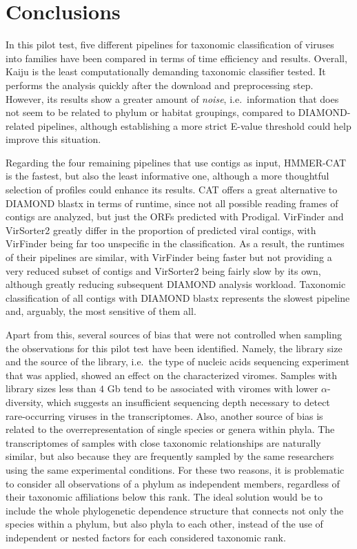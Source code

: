 \documentclass[
  openany]{book}
\begin{document}
\hypertarget{conclusions}{%
\section{Conclusions}\label{conclusions}}

In this pilot test, five different pipelines for taxonomic classification of viruses into families have been compared in terms of time efficiency and results. Overall, Kaiju is the least computationally demanding taxonomic classifier tested. It performs the analysis quickly after the download and preprocessing step. However, its results show a greater amount of \emph{noise}, i.e.~information that does not seem to be related to phylum or habitat groupings, compared to DIAMOND-related pipelines, although establishing a more strict E-value threshold could help improve this situation.

Regarding the four remaining pipelines that use contigs as input, HMMER-CAT is the fastest, but also the least informative one, although a more thoughtful selection of profiles could enhance its results. CAT offers a great alternative to DIAMOND blastx in terms of runtime, since not all possible reading frames of contigs are analyzed, but just the ORFs predicted with Prodigal. VirFinder and VirSorter2 greatly differ in the proportion of predicted viral contigs, with VirFinder being far too unspecific in the classification. As a result, the runtimes of their pipelines are similar, with VirFinder being faster but not providing a very reduced subset of contigs and VirSorter2 being fairly slow by its own, although greatly reducing subsequent DIAMOND analysis workload. Taxonomic classification of all contigs with DIAMOND blastx represents the slowest pipeline and, arguably, the most sensitive of them all.

Apart from this, several sources of bias that were not controlled when sampling the observations for this pilot test have been identified. Namely, the library size and the source of the library, i.e.~the type of nucleic acids sequencing experiment that was applied, showed an effect on the characterized viromes. Samples with library sizes less than \(4\) Gb tend to be associated with viromes with lower \(\alpha\)-diversity, which suggests an insufficient sequencing depth necessary to detect rare-occurring viruses in the transcriptomes. Also, another source of bias is related to the overrepresentation of single species or genera within phyla. The transcriptomes of samples with close taxonomic relationships are naturally similar, but also because they are frequently sampled by the same researchers using the same experimental conditions. For these two reasons, it is problematic to consider all observations of a phylum as independent members, regardless of their taxonomic affiliations below this rank. The ideal solution would be to include the whole phylogenetic dependence structure that connects not only the species within a phylum, but also phyla to each other, instead of the use of independent or nested factors for each considered taxonomic rank.
\end{document}
